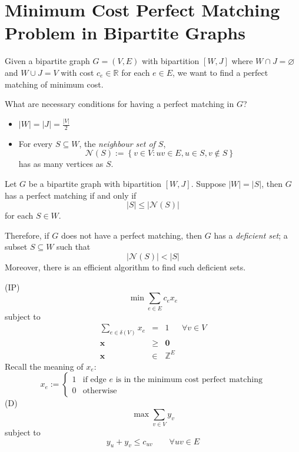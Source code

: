 \section{Minimum Cost Perfect Matching Problem in Bipartite Graphs}
Given a bipartite graph $ G=(V,E) $ with bipartition $ [W,J] $ where
$ W\cap J = \varnothing $ and $ W\cup J = V $
with cost $ c_e\in\mathbb{R} $ for each $ e\in E $, we want to find
a perfect matching of minimum cost.

What are necessary conditions for having a perfect matching in $ G $?
\begin{itemize}
    \item $ |W|=|J|=\frac{|V|}{2} $
    \item For every $ S\subseteq W $, the \emph{neighbour set of $ S $},
          \[ \mathcal{N}(S):=\left\{ v\in V : uv\in E, u\in S, v\notin S\right\} \]
          has as many vertices as $ S $.
\end{itemize}

\begin{thmbox}
    \begin{theorem}
        Let $ G $ be a bipartite graph with bipartition $ [W,J] $.
        Suppose $ |W|=|S| $, then $ G $ has a perfect matching if and only if
        \[ |S|\leqslant |\mathcal{N}(S)| \]
        for each $ S\in W $.
    \end{theorem}
\end{thmbox}
Therefore, if $ G $ does not have a perfect matching, then $ G $
has a \emph{deficient set}; a subset $ S\subseteq W $ such that
\[ |\mathcal{N}(S)|<|S| \]
Moreover, there is an efficient algorithm to find such deficient sets.

(IP)
\[ \min \sum\limits_{e\in E}c_e x_e \]
subject to
\[
    \begin{array}{cccc}
        \sum\limits_{e\in \delta(V)}x_e & =         & 1            & \forall v\in V \\
        \bm{x}                          & \geqslant & \bm{0}                        \\
        \bm{x}                          & \in       & \mathbb{Z}^E
    \end{array} \]
Recall the meaning of $ x_e $:
\[ x_e:=
    \begin{cases}
        1 & \text{if edge $e$ is in the minimum cost perfect matching} \\
        0 & \text{otherwise}
    \end{cases} \]
(D)
\[ \max \sum\limits_{v\in V}y_v  \]
subject to
\[ y_u+y_v\leqslant c_{uv}\qquad \forall uv\in E \]

